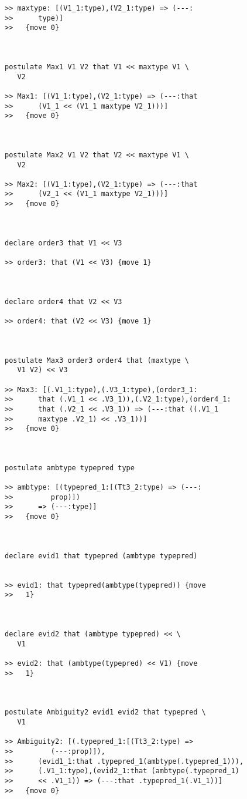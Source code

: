 \documentclass[12pt]{article}
\begin{document}
\begin{verbatim}
>> maxtype: [(V1_1:type),(V2_1:type) => (---:
>>      type)]
>>   {move 0}



postulate Max1 V1 V2 that V1 << maxtype V1 \
   V2

>> Max1: [(V1_1:type),(V2_1:type) => (---:that
>>      (V1_1 << (V1_1 maxtype V2_1)))]
>>   {move 0}



postulate Max2 V1 V2 that V2 << maxtype V1 \
   V2

>> Max2: [(V1_1:type),(V2_1:type) => (---:that
>>      (V2_1 << (V1_1 maxtype V2_1)))]
>>   {move 0}



declare order3 that V1 << V3

>> order3: that (V1 << V3) {move 1}



declare order4 that V2 << V3

>> order4: that (V2 << V3) {move 1}



postulate Max3 order3 order4 that (maxtype \
   V1 V2) << V3

>> Max3: [(.V1_1:type),(.V3_1:type),(order3_1:
>>      that (.V1_1 << .V3_1)),(.V2_1:type),(order4_1:
>>      that (.V2_1 << .V3_1)) => (---:that ((.V1_1
>>      maxtype .V2_1) << .V3_1))]
>>   {move 0}



postulate ambtype typepred type

>> ambtype: [(typepred_1:[(Tt3_2:type) => (---:
>>         prop)])
>>      => (---:type)]
>>   {move 0}



declare evid1 that typepred (ambtype typepred)


>> evid1: that typepred(ambtype(typepred)) {move
>>   1}



declare evid2 that (ambtype typepred) << \
   V1

>> evid2: that (ambtype(typepred) << V1) {move
>>   1}



postulate Ambiguity2 evid1 evid2 that typepred \
   V1

>> Ambiguity2: [(.typepred_1:[(Tt3_2:type) =>
>>         (---:prop)]),
>>      (evid1_1:that .typepred_1(ambtype(.typepred_1))),
>>      (.V1_1:type),(evid2_1:that (ambtype(.typepred_1)
>>      << .V1_1)) => (---:that .typepred_1(.V1_1))]
>>   {move 0}


\end{verbatim}
\end{document}
